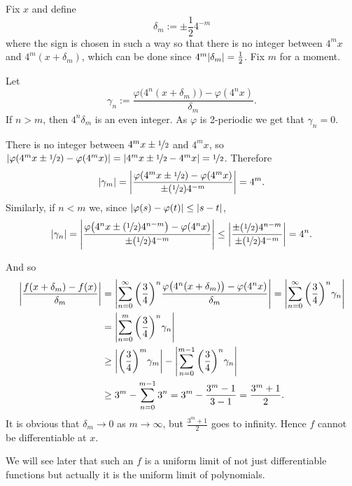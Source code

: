 \begin{example}
Fix $x$ and
define
\begin{equation*}
\delta_m := \pm \frac{1}{2} 4^{-m}
\end{equation*}
where the sign is chosen in such a way so that there is no integer
between $4^m x$ and $4^m(x+\delta_m)$, which can be done
since $4^m\lvert {\delta_m} \rvert = \frac{1}{2}$.  Fix $m$ for a moment.

Let
\begin{equation*}
\gamma_{n} :=
\frac{\varphi\bigl(4^n(x+\delta_m)\bigr)-\varphi(4^nx)}{\delta_m} .
\end{equation*}
If $n > m$, then $4^n\delta_m$ is an even integer.  As $\varphi$
is 2-periodic we get that $\gamma_n = 0$.

There is no integer between 
$4^mx\pm\nicefrac{1}{2}$ and $4^mx$, so
$\left\lvert {\varphi(4^mx\pm\nicefrac{1}{2})-\varphi(4^mx)} \right\rvert =
\left\lvert {4^mx\pm\nicefrac{1}{2}-4^mx} \right\rvert = \nicefrac{1}{2}$.  Therefore
\begin{equation*}
\lvert {\gamma_m} \rvert =
\left\lvert {
\frac{\varphi(4^mx\pm\nicefrac{1}{2})-\varphi(4^mx)}{\pm (\nicefrac{1}{2}) 4^{-m}}
} \right\rvert
= 4^m .
\end{equation*}
Similarly, if $n < m$ we, since $\lvert {\varphi(s) -\varphi(t)} \rvert \leq
\lvert {s-t} \rvert$,
\begin{equation*}
\lvert {\gamma_n} \rvert =
\left\lvert {\frac{\varphi\bigl(4^nx\pm(\nicefrac{1}{2})4^{n-m}\bigr)-\varphi(4^nx)}{\pm
(\nicefrac{1}{2}) 4^{-m}}} \right\rvert
\leq
\left\lvert {\frac{\pm(\nicefrac{1}{2})4^{n-m}}{\pm (\nicefrac{1}{2}) 4^{-m}}} \right\rvert = 4^n
.
\end{equation*}

And so
\begin{equation*}
\begin{split}
\left\lvert {
\frac{f(x+\delta_m)-f(x)}{\delta_m}
} \right\rvert
& =
\left\lvert {
\sum_{n=0}^\infty 
{\left(\frac{3}{4}\right)}^n
\frac{\varphi\bigl(4^n(x+\delta_m)\bigr)-\varphi(4^nx)}{\delta_m}
} \right\rvert
=
\left\lvert {
\sum_{n=0}^\infty 
{\left(\frac{3}{4}\right)}^n
\gamma_n
} \right\rvert
\\
& =
\left\lvert {
\sum_{n=0}^m 
{\left(\frac{3}{4}\right)}^n
\gamma_n
} \right\rvert
\\
& \geq
\left\lvert {
{\left(\frac{3}{4}\right)}^m
\gamma_m} \right\rvert
-
\left\lvert {
\sum_{n=0}^{m-1} 
{\left(\frac{3}{4}\right)}^n
\gamma_n
} \right\rvert
\\
& \geq
3^m
-
\sum_{n=0}^{m-1} 
3^n
=
3^m
-
\frac{3^{m}-1}{3-1}
=
\frac{3^m +1}{2} .
\end{split}
\end{equation*}
It is obvious that $\delta_m \to 0$ as $m \to \infty$, but $\frac{3^m+1}{2}$
goes to infinity.  Hence $f$ cannot be differentiable at $x$.

We will see later that such an $f$ is a uniform limit of not just
differentiable functions but actually it is the uniform limit of
polynomials.
\end{example}


